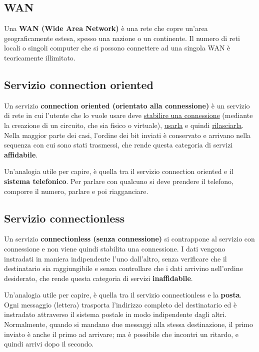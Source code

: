 \documentclass{article}
\begin{document}
        \subsection{WAN}
        Una \textbf{WAN (Wide Area Network)} è una rete che copre un’area geograficamente estesa, spesso
        una nazione o un continente. Il numero di reti locali o singoli computer che si possono
        connettere ad una singola WAN è teoricamente illimitato.

        \subsection{Servizio connection oriented}
        Un servizio \textbf{connection oriented (orientato alla connessione)} è un servizio di rete in cui
        l’utente che lo vuole usare deve \underline{stabilire una connessione} (mediante la creazione di un circuito,
        che sia fisico o virtuale), \underline{usarla} e quindi \underline{rilasciarla}. Nella maggior parte dei casi, l’ordine dei bit
        inviati è conservato e arrivano nella sequenza con cui sono stati trasmessi, che rende questa
        categoria di servizi \textbf{affidabile}.\newline

        Un’analogia utile per capire, è quella tra il servizio connection oriented e il \textbf{sistema telefonico}.
        Per parlare con qualcuno si deve prendere il telefono, comporre il numero, parlare e poi
        riagganciare.

        \subsection{Servizio connectionless}
        Un servizio \textbf{connectionless (senza connessione)} si contrappone al servizio con connessione
        e non viene quindi stabilita una connessione. I dati vengono instradati in maniera indipendente
        l’uno dall’altro, senza verificare che il destinatario sia raggiungibile e senza controllare che i
        dati arrivino nell’ordine desiderato, che rende questa categoria di servizi \textbf{inaffidabile}.\newline

        Un’analogia utile per capire, è quella tra il servizio connectionless e la \textbf{posta}. Ogni messaggio
        (lettera) trasporta l’indirizzo completo del destinatario ed è instradato attraverso il sistema
        postale in modo indipendente dagli altri. Normalmente, quando si mandano due messaggi alla
        stessa destinazione, il primo inviato è anche il primo ad arrivare; ma è possibile che incontri un
        ritardo, e quindi arrivi dopo il secondo.
\end{document}
